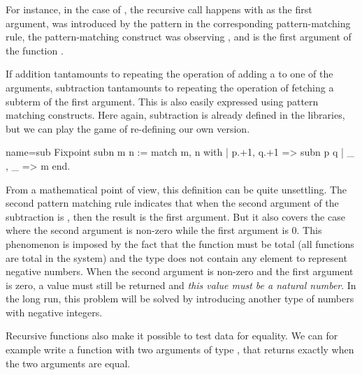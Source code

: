 For instance, in the case of , the recursive call happens
with  as the first argument,  was introduced by the pattern 
in the corresponding pattern-matching rule, the pattern-matching
construct was observing , and  is the first argument of the
function .

% 
% 
If addition tantamounts to repeating the operation of adding a 
to one of the arguments, subtraction tantamounts to repeating the
operation of fetching a subterm of the first argument.  This is also
easily expressed using pattern matching constructs.  Here again,
subtraction is already defined in the libraries, but we can play the game
of re-defining our own version.

\begin{coq}{name=sub}{}
Fixpoint subn m n :=
  match m, n with
  | p.+1, q.+1 => subn p q
  | _ , _ => m
  end.
\end{coq}
From a mathematical point of view, this definition can be quite
unsettling.  The second pattern matching rule indicates that when
the second argument of the subtraction is , then the result is
the first argument.  But it also covers the case where the second
argument is non-zero while the first argument is 0.  This phenomenon
is imposed by the fact that the function must be total (all functions
are total in the \Coq{} system) and the type  does not contain any
element to represent negative numbers.  When the second argument is non-zero
and the first argument is zero, a value must still be returned and
{\em this value must be a natural number}.  In the long run, this
problem will be solved by introducing another type of numbers with
negative integers.

Recursive functions also make it possible to test data for
equality. We can for example write a function with two arguments of
type , that
returns  exactly when the two arguments are equal.

